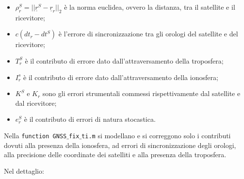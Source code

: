 \documentclass[a4paper,11pt,twoside]{book}
\begin{document}
	\begin{itemize}[-]
		\item $\rho^S_r = || \underline{r}^S - \underline{r}_r ||_2 $ è la norma euclidea, ovvero la distanza, tra il satellite e il ricevitore;
		
		\item $c (dt_r - dt^S)$ è l'errore di sincronizzazione tra gli orologi del satellite e del ricevitore;
		
		\item $T^S_r$ è il contributo di errore dato dall'attraversamento della troposfera;
		
		\item $I^s_r$ è il contributo di errore dato dall'attraversamento della ionosfera;
		
		\item $K^S$ e $K_r$ sono gli errori strumentali commessi rispettivamente dal satellite e dal ricevitore;
		
		\item $e^S_r$ è il contributo di errori di natura stocastica.
	\end{itemize}
	
	
	
	Nella \texttt{function GNSS$\_$fix$\_$ti.m} si modellano e si correggono solo i contributi dovuti alla presenza della ionosfera, ad errori di sincronizzazione degli orologi, alla precisione delle coordinate dei satelliti e alla presenza della troposfera.
	
	Nel dettaglio:
	
\end{document}
